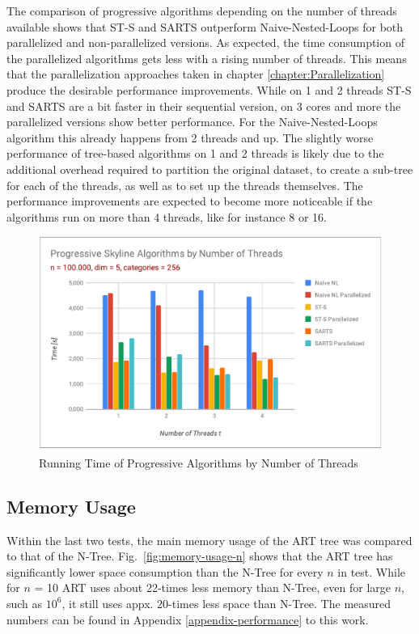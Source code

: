 The comparison of progressive algorithms depending on the number of threads available shows that ST-S and SARTS outperform Naive-Nested-Loops for both parallelized and non-parallelized versions. As expected, the time consumption of the parallelized algorithms gets less with a rising number of threads. This means that the parallelization approaches taken in chapter \ref{chapter:Parallelization} produce the desirable performance improvements. While on 1 and 2 threads ST-S and SARTS are a bit faster in their sequential version, on 3 cores and more the parallelized versions show better performance. For the Naive-Nested-Loops algorithm this already happens from 2 threads and up. 
The slightly worse performance of tree-based algorithms on 1 and 2 threads is likely due to the additional overhead required to partition the original dataset, to create a sub-tree for each of the threads, as well as to set up the threads themselves. The performance improvements are expected to become more noticeable if the algorithms run on more than 4 threads, like for instance 8 or 16. 

\begin{figure}[h]
	\centering
	\includegraphics[width=1\linewidth]{figures/progressive-threads}
	\caption{Running Time of Progressive Algorithms by Number of Threads}
	\label{fig:progressive-threads}
\end{figure}

\subsection{Memory Usage}
Within the last two tests, the main memory usage of the ART tree was compared to that of the N-Tree. 
Fig.~\ref{fig:memory-usage-n} shows that the ART tree has significantly lower space consumption than the N-Tree for every $n$ in test. While for $n$ = 10 ART uses about 22-times less memory than N-Tree, even for large $n$, such as $10^{6}$, it still uses appx. 20-times less space than N-Tree. The measured numbers can be found in Appendix \ref{appendix-performance} to this work. 

